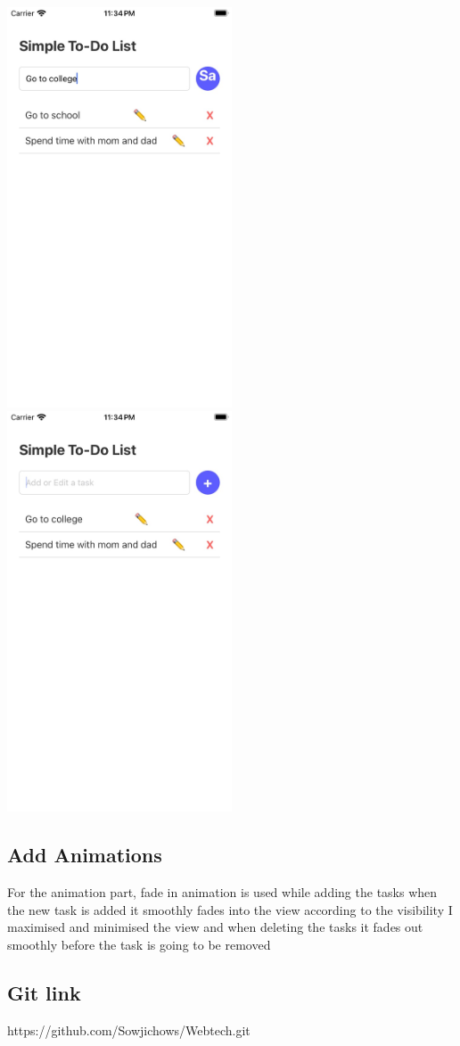 \documentclass[a4paper,12pt]{article}
\begin{document}
\includegraphics[width=0.5\textwidth]{Edit task.jpeg}
\includegraphics[width=0.5\textwidth]{edit 2.jpeg}

\subsection{Add Animations }
For the animation part, fade in animation is used while adding the tasks when the new task is added it smoothly fades into the view according to the visibility I maximised and minimised the view and when deleting the tasks it fades out smoothly before the task is going to be removed

\subsection{ Git link}

https://github.com/Sowjichows/Webtech.git
\end{document}
